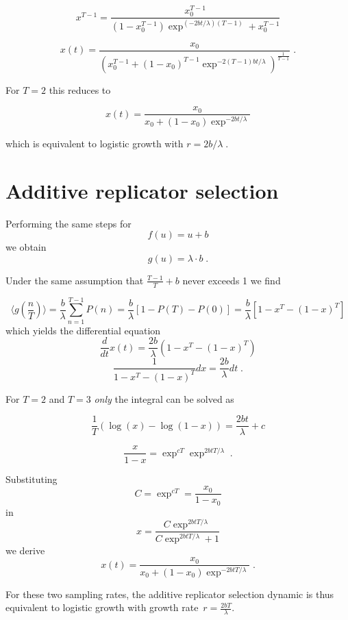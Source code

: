$$x^{T-1}=\frac{x_0^{T-1}}{(1-x_0^{T-1})\exp^{(-2bt/\lambda)(T-1)}+x_0^{T-1}}$$




$$x(t)=\frac{x_0}{(x_0^{T-1}+(1-x_0)^{T-1}\exp^{-2(T-1)bt/\lambda})^\frac{1}{T-1}}\;.$$

For $T=2$ this reduces to

$$x(t)=\frac{x_0}{x_0+(1-x_0)\exp^{-2bt/\lambda}}$$

which is equivalent to logistic growth with $r=2b/\lambda\;.$

\section{Additive replicator selection}

Performing the same steps for
$$f(u)=u+b$$
we obtain
$$g(u) = \lambda\cdot b\;.$$

Under the same assumption that $\frac{T-1}{T}+b$ never exceeds 1 we find

$$\langle g(\frac{n}{T})\rangle=\frac{b}{\lambda}\sum_{n=1}^{T-1} P(n)=\frac{b}{\lambda}[1-P(T)-P(0)]=\frac{b}{\lambda}[1-x^T-(1-x)^T]$$
which yields the differential equation
$$\frac{d}{dt}x(t)=\frac{2b}{\lambda}(1-x^T-(1-x)^T)$$
$$\frac{1}{1-x^T-(1-x)^T}dx=\frac{2b}{\lambda}dt\;.$$

For $T=2$ and $T=3$ \emph{only} the integral can be solved as

$$\frac{1}{T}(\log(x)-\log(1-x))=\frac{2bt}{\lambda}+c$$

$$\frac{x}{1-x}=\exp^{cT}\exp^{2btT/\lambda}\;.$$

Substituting
$$C=\exp^{cT}=\frac{x_0}{1-x_0}$$
in
$$x=\frac{C\exp^{2btT/\lambda}}{C\exp^{2btT/\lambda}+1}$$
we derive
$$x(t)=\frac{x_0}{x_0+(1-x_0)\exp^{-2btT/\lambda}}\;.$$

For these two sampling rates, the additive replicator selection dynamic is thus equivalent to logistic growth with growth rate~$r=\frac{2bT}{\lambda}$.
